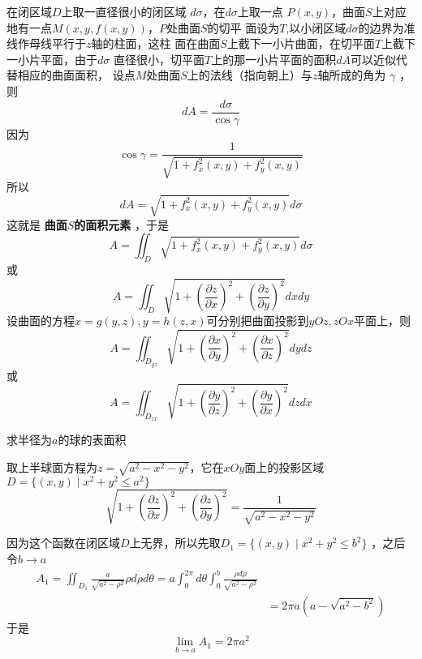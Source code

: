 \documentclass[11pt]{article}
\begin{document}
在闭区域\(D\)上取一直径很小的闭区域 \(d\sigma\)，在\(d\sigma\)上取一点
\(P(x,y)\)，曲面\(S\)上对应地有一点\(M(x,y,f(x,y))\)，\(P\)处曲面\(S\)的切平
面设为\(T\),以小闭区域\(d\sigma\)的边界为准线作母线平行于\(z\)轴的柱面，这柱
面在曲面\(S\)上截下一小片曲面，在切平面\(T\)上截下一小片平面，由于\(d\sigma\)
直径很小，切平面\(T\)上的那一小片平面的面积\(dA\)可以近似代替相应的曲面面积，
设点\(M\)处曲面\(S\)上的法线（指向朝上）与\(z\)轴所成的角为 \(\gamma\) ，则
\begin{equation*}
dA=\frac{d\sigma}{\cos\gamma}
\end{equation*}
因为
\begin{equation*}
\cos\gamma=\frac{1}{\sqrt{1+f_x^2(x,y)+f_y^2(x,y)}}
\end{equation*}
所以
\begin{equation*}
dA=\sqrt{1+f_x^2(x,y)+f_y^2(x,y)}d\sigma
\end{equation*}
这就是 \textbf{曲面\(S\)的面积元素} ，于是
\begin{equation*}
A=\iint_D\sqrt{1+f_x^2(x,y)+f_y^2(x,y)}d\sigma
\end{equation*}
或
\begin{equation*}
A=\iint_D\sqrt{1+(\frac{\partial z}{\partial x})^2+(\frac{\partial z}{\partial y})^2}dxdy
\end{equation*}
设曲面的方程\(x=g(y,z),y=h(z,x)\)可分别把曲面投影到\(yOz,zOx\)平面上，则
\begin{equation*}
A=\iint_{D_{yz}}\sqrt{1+(\frac{\partial x}{\partial y})^2+(\frac{\partial x}{\partial z})^2}dydz
\end{equation*}
或
\begin{equation*}
A=\iint_{D_{zx}}\sqrt{1+(\frac{\partial y}{\partial z})^2+(\frac{\partial y}{\partial x})^2}dzdx
\end{equation*}

\begin{examplle}[]
求半径为\(a\)的球的表面积

取上半球面方程为\(z=\sqrt{a^2-x^2-y^2}\)，它在\(xOy\)面上的投影区域
\(D=\{(x,y)\mid x^2+y^2\le a^2\}\)
\begin{equation*}
\sqrt{1+(\frac{\partial z}{\partial x})^2+(\frac{\partial z}{\partial y})^2}=\frac{1}{\sqrt{a^2-x^2-y^2}}
\end{equation*}

因为这个函数在闭区域\(D\)上无界，所以先取\(D_1=\{(x,y)\mid x^2+y^2\le b^2\}\)
，之后令\(b\to a\)
\begin{align*}
A_1=\iint_{D_1}\frac{a}{\sqrt{a^2-\rho^2}}\rho d\rho d\theta=
a\int_0^{2\pi}d\theta\int_0^b\frac{\rho d\rho}{\sqrt{a^2-\rho^2}}\\
&=2\pi a(a-\sqrt{a^2-b^2})
\end{align*}
于是
\begin{equation*}
\lim_{b\to a}A_1=2\pi a^2
\end{equation*}
\end{examplle}
\end{document}
